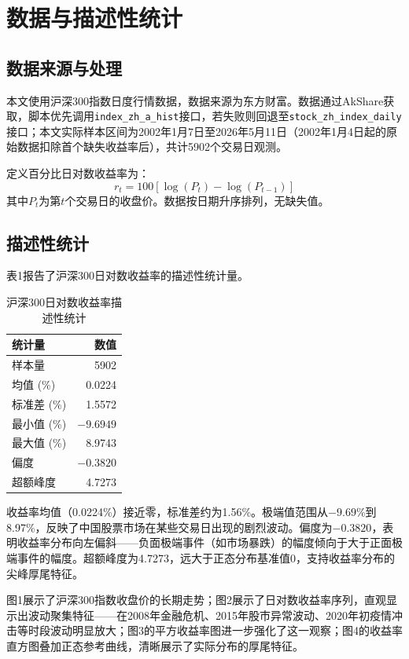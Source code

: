 \documentclass[11pt,a4paper]{article}
\begin{document}
\section{数据与描述性统计}

\subsection{数据来源与处理}

本文使用沪深300指数日度行情数据，数据来源为东方财富。数据通过AkShare获取，脚本优先调用\texttt{index\_zh\_a\_hist}接口，若失败则回退至\texttt{stock\_zh\_index\_daily}接口；本文实际样本区间为2002年1月7日至2026年5月11日（2002年1月4日起的原始数据扣除首个缺失收益率后），共计5902个交易日观测。

定义百分比日对数收益率为：
\[
r_t = 100[\log(P_t)-\log(P_{t-1})]
\]
其中\(P_t\)为第\(t\)个交易日的收盘价。数据按日期升序排列，无缺失值。

\subsection{描述性统计}

表1报告了沪深300日对数收益率的描述性统计量。

\begin{table}[ht]
\centering
\caption{沪深300日对数收益率描述性统计}
\begin{tabular}{lr}
\toprule
统计量 & 数值 \\
\midrule
样本量 & 5902 \\
均值 (\%) & 0.0224 \\
标准差 (\%) & 1.5572 \\
最小值 (\%) & $-9.6949$ \\
最大值 (\%) & 8.9743 \\
偏度 & $-0.3820$ \\
超额峰度 & 4.7273 \\
\bottomrule
\end{tabular}
\end{table}

收益率均值（0.0224\%）接近零，标准差约为1.56\%。极端值范围从$-9.69\%$到8.97\%，反映了中国股票市场在某些交易日出现的剧烈波动。偏度为$-0.3820$，表明收益率分布向左偏斜——负面极端事件（如市场暴跌）的幅度倾向于大于正面极端事件的幅度。超额峰度为4.7273，远大于正态分布基准值0，支持收益率分布的尖峰厚尾特征。

图1展示了沪深300指数收盘价的长期走势；图2展示了日对数收益率序列，直观显示出波动聚集特征——在2008年金融危机、2015年股市异常波动、2020年初疫情冲击等时段波动明显放大；图3的平方收益率图进一步强化了这一观察；图4的收益率直方图叠加正态参考曲线，清晰展示了实际分布的厚尾特征。
\end{document}
